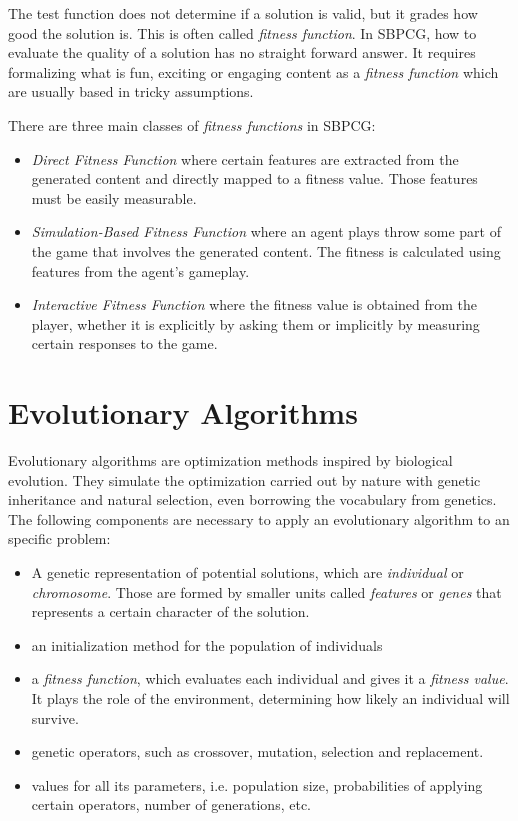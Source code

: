 The test function does not determine if a solution is valid, but it grades how good the solution is. This is often called \textit{fitness function}. In \ac{SBPCG}, how to evaluate the quality of a solution has no straight forward answer. It requires formalizing what is fun, exciting or engaging content  as a \textit{fitness function} which are usually based in tricky assumptions. 

There are three main classes of \textit{fitness functions} in \ac{SBPCG}\cite{togelius2010search}:

\begin{itemize}
	\item \textit{Direct Fitness Function} where certain features are extracted from the generated  content and directly mapped to a fitness value. Those features must be easily measurable.
	\item \textit{Simulation-Based Fitness Function} where an agent plays throw some part of the game that involves the generated content. The fitness is calculated using features from the agent's gameplay.
	\item \textit{Interactive Fitness Function} where the fitness value is obtained from the player, whether it is explicitly by asking them or implicitly by measuring certain responses to the game.
\end{itemize}


\section{Evolutionary Algorithms}\label{s:EAoverview}

Evolutionary algorithms are optimization methods inspired by biological evolution. They simulate the optimization carried out by nature with genetic inheritance and natural selection, even borrowing the vocabulary from genetics. The following components are necessary to apply an evolutionary algorithm to an specific problem:
\begin{itemize}
	\item A genetic representation of potential solutions, which are \textit{individual} or \textit{chromosome}. Those are formed by smaller units called \textit{features} or \textit{genes} that represents a certain character of the solution.
	\item an initialization method for the population of individuals
	\item a \textit{fitness function}, which evaluates each individual and gives it a \textit{fitness value}. It plays the role of the environment, determining how likely an individual will survive.
	\item genetic operators, such as crossover, mutation, selection and replacement.
	\item values for all its parameters, i.e. population size, probabilities of applying certain operators, number of generations, etc.
\end{itemize}

